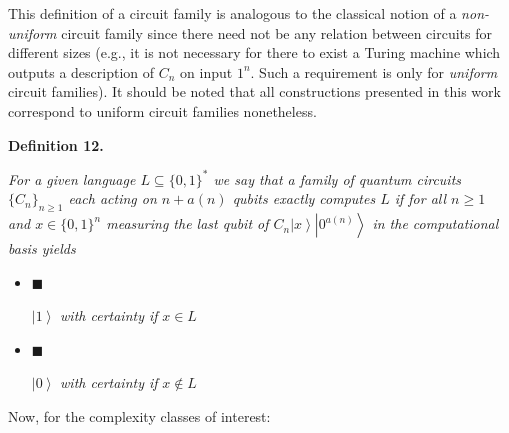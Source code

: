 


This definition of a circuit family is analogous to the classical notion of a \emph{non-uniform} circuit family since there need not be any relation between circuits for different sizes (e.g., it is not necessary for there to exist a Turing machine which outputs a description of $C_{n}$ on input $1^{n}$. Such a requirement is only for \emph{uniform} circuit families). It should be noted that all constructions presented in this work correspond to uniform circuit families nonetheless.\par





\par\medskip\noindent\textbf{
\textbf{Definition 12}\textbf{.}
}\par



\emph{For a given language $L\subseteq\{0,1\}^{*}$ we say that a family of quantum circuits $\{C_{n}\}_{n\geq 1}$ each acting on $n+a(n)$ qubits exactly computes $L$ if for all $n\geq 1$ and $x\in\{0,1\}^{n}$ measuring the last qubit of $C_{n}\left|x\right\rangle\left|0^{a(n)}\right\rangle$ in the computational basis yields}\par


\begin{itemize}


\item[] 
$\blacksquare$ 


$\left|1\right\rangle$\emph{ with certainty if }$x\in L$\emph{}\par





\item[] 
$\blacksquare$ 


$\left|0\right\rangle$\emph{ with certainty if }$x\not\in L$\emph{}\par





\end{itemize}






Now, for the complexity classes of interest:\par



